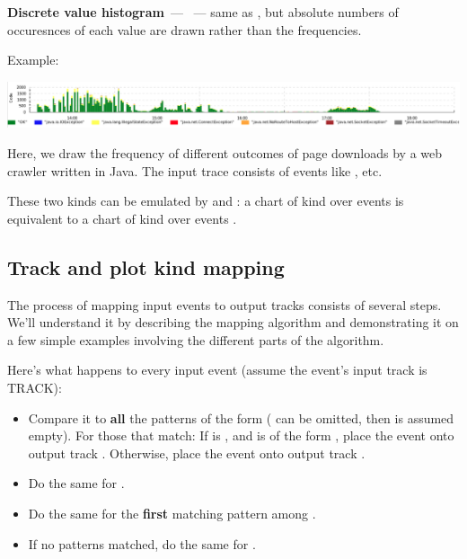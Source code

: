\documentclass{article}
\begin{document}
\textbf{Discrete value histogram}~--- ~--- same as , but absolute numbers of occuresnces of each value are drawn rather than the frequencies.

Example: 

\centerline{\includegraphics[width=\textwidth]{pics/tplot/hist.png}}

Here, we draw the frequency of different outcomes of page downloads by a web crawler written in Java. The input trace consists of events like ,  etc.

These two kinds can be emulated by  and : a chart of kind  over events  is equivalent to a chart of kind  over events .

\pagebreak
\subsection{Track and plot kind mapping}
\label{sec:tplot-track-mapping}
The process of mapping input events to output tracks consists of several steps. We'll understand it by describing the mapping algorithm and demonstrating it on a few simple examples involving the different parts of the algorithm.

Here's what happens to every input event (assume the event's input track is TRACK):
\begin{itemize}
\item Compare it to \textbf{all} the patterns of the form  ( can be omitted, then  is assumed empty). For those that match:
\subitem If  is , and  is of the form , place the event onto output track .
\subitem Otherwise, place the event onto output track .
\item Do the same for .
\item Do the same for the \textbf{first} matching pattern among .
\item If no  patterns matched, do the same for .
\end{itemize}
\end{document}
